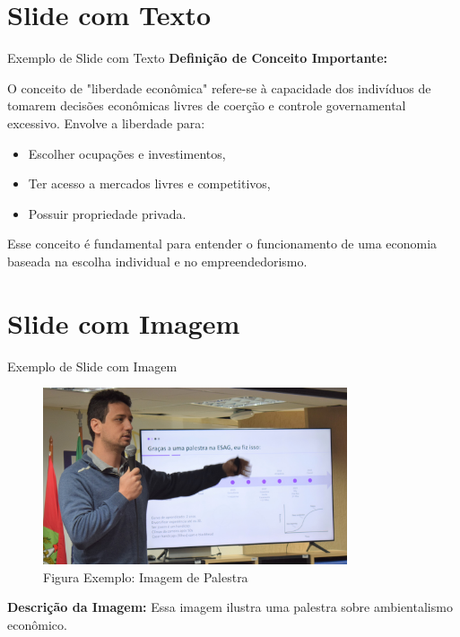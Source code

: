\section{Slide com Texto}
\begin{frame}{Exemplo de Slide com Texto}
    \textbf{Definição de Conceito Importante:}
    
    O conceito de "liberdade econômica" refere-se à capacidade dos indivíduos de tomarem decisões econômicas livres de coerção e controle governamental excessivo. Envolve a liberdade para:
    \begin{itemize}
        \item Escolher ocupações e investimentos,
        \item Ter acesso a mercados livres e competitivos,
        \item Possuir propriedade privada.
    \end{itemize}
    Esse conceito é fundamental para entender o funcionamento de uma economia baseada na escolha individual e no empreendedorismo.
\end{frame}

\section{Slide com Imagem}
\begin{frame}{Exemplo de Slide com Imagem}
    \centering
    \begin{figure}
        \centering
        \includegraphics[width=0.8\textwidth]{img/exemplo_img.jpg} %
        \caption{Figura Exemplo: Imagem de Palestra} %
    \end{figure}
    
    \textbf{Descrição da Imagem:}
    Essa imagem ilustra uma palestra sobre ambientalismo econômico.
    \newline
    \newline %
\end{frame}

